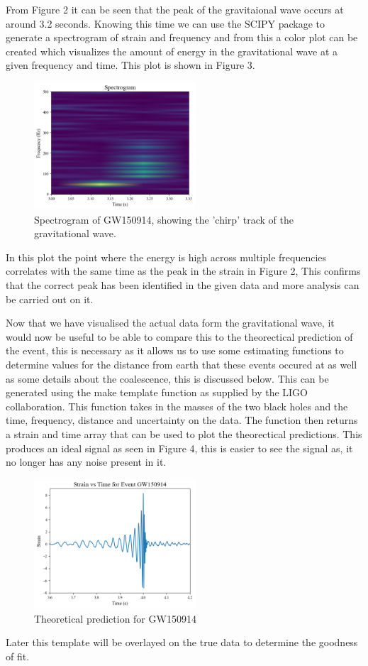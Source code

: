 \documentclass[]{article}
\begin{document}
\newline
\newline
From Figure 2 it can be seen that the peak of the gravitaional wave occurs at
around 3.2 seconds.
Knowing this time we can use the SCIPY package to generate a spectrogram of strain and frequency and from this a color plot can be
created which visualizes the amount of energy in the gravitational wave at a given
frequency and time. This plot is shown in Figure 3.
\begin{figure}[h]
    \includegraphics[width=6cm]{images/spectrogram_gw150914.png}
    \caption{Spectrogram of GW150914, showing the 'chirp' track of the gravitational wave.}
    \label{fig:spectrogram}
\end{figure}
\newline
In this plot the point where the energy is high across multiple frequencies
correlates with the same time as the peak in the strain in Figure 2, This confirms that the correct peak has been identified
in the given data and more analysis can be carried out on it.

Now that we have visualised the actual data form the gravitational wave, it would now
be useful to be able to compare this to the theorectical prediction of the event, this is necessary as it allows us
to use some estimating functions to determine values for the distance from earth that these events occured at as well as some
details about the coalescence, this is discussed below.
This can be generated using the make template function as supplied by the LIGO
collaboration. This function takes in the masses of the two black holes and
the time, frequency, distance and uncertainty on the data. The function then returns
a strain and time array that can be used to plot the theorectical predictions.
This produces an ideal signal as seen in Figure 4, this is easier to see the signal as,
it no longer has any noise present in it.
\begin{figure}[h]
    \includegraphics[width=6cm]{images/ideal_signal_gw150914.png}
    \caption{Theoretical prediction for GW150914}
    \label{fig:ideal_signal}
\end{figure}
\newline
Later this template will be overlayed on the true data to determine the goodness of fit.
\end{document}
